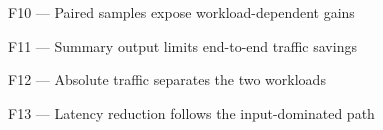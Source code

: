 \documentclass[aspectratio=169,10pt]{beamer}
\begin{document}
\begin{frame}{F10 --- Paired samples expose workload-dependent gains}
\centering
\PlotTotalECDF
\end{frame}

\begin{frame}{F11 --- Summary output limits end-to-end traffic savings}
\centering
\PlotOutputShare
\end{frame}

\begin{frame}{F12 --- Absolute traffic separates the two workloads}
\centering
\PlotAbsoluteTotal
\end{frame}

\begin{frame}{F13 --- Latency reduction follows the input-dominated path}
\centering
\PlotLatencyReduction
\end{frame}
\end{document}
